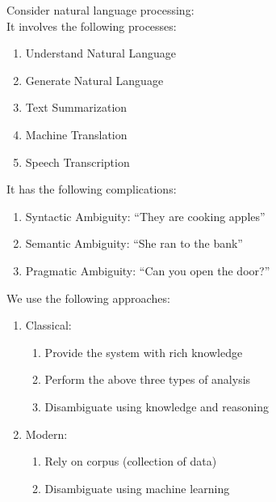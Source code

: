 \documentclass[../../lecture_notes.tex]{subfiles}
\begin{document}
\noindent Consider natural language processing:\\
	\indent It involves the following processes:
		\begin{enumerate} [itemsep=0mm]
			\item Understand Natural Language
			\item Generate Natural Language
			\item Text Summarization
			\item Machine Translation
			\item Speech Transcription
		\end{enumerate}
	It has the following complications:
	\begin{enumerate} [itemsep=0mm]
		\item Syntactic Ambiguity: “They are cooking apples”
		\item Semantic Ambiguity: “She ran to the bank”
		\item Pragmatic Ambiguity: “Can you open the door?”
	\end{enumerate}
\noindent We use the following approaches:
\begin{enumerate} [itemsep=0mm]
	\item Classical: 
		\begin{enumerate} [itemsep=0mm]
			\item Provide the system with rich knowledge
			\item Perform the above three types of analysis
			\item Disambiguate using knowledge and reasoning
		\end{enumerate}
	\item Modern:
		\begin{enumerate} [itemsep=0mm]
			\item Rely on corpus (collection of data)
			\item Disambiguate using machine learning
		\end{enumerate}
\end{enumerate} \medskip
\end{document}
